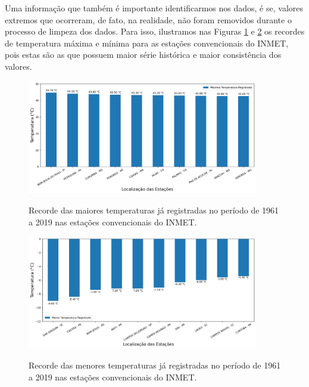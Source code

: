 Uma informação que também é importante identificarmos nos dados, é se, valores extremos que ocorreram, de fato, na realidade, não foram removidos durante o processo de limpeza dos dados.
Para isso, ilustramos nas Figuras \ref{fig:estacoes_convencionais_maiores_temperaturas} e \ref{fig:estacoes_convencionais_menores_temperaturas} os recordes de temperatura máxima e mínima para as estações convencionais do INMET, pois estas são as que possuem maior série histórica e maior consistência dos valores. 

\begin{figure}[H]
    \centering
    \caption{Recorde das maiores temperaturas já registradas no período de 1961 a 2019 nas estações convencionais do INMET.}
    \includegraphics[width=0.9\textwidth]{figuras/estacoes_convencionais_maiores_temperaturas.png}
    \label{fig:estacoes_convencionais_maiores_temperaturas}
\end{figure}

\begin{figure}[H]
    \centering
    \caption{Recorde das menores temperaturas já registradas no período de 1961 a 2019 nas estações convencionais do INMET.}
    \includegraphics[width=0.9\textwidth]{figuras/estacoes_convencionais_menores_temperaturas.png}
    \label{fig:estacoes_convencionais_menores_temperaturas}
\end{figure}

